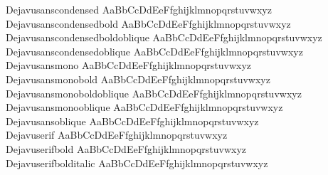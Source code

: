 \begin{tabbing}
Dejavusanscondensed \> { AaBbCcDdEeFfghijklmnopqrstuvwxyz} \\
Dejavusanscondensedbold \> { AaBbCcDdEeFfghijklmnopqrstuvwxyz} \\
Dejavusanscondensedboldoblique \> { AaBbCcDdEeFfghijklmnopqrstuvwxyz} \\
Dejavusanscondensedoblique \> { AaBbCcDdEeFfghijklmnopqrstuvwxyz} \\
Dejavusansmono \> { AaBbCcDdEeFfghijklmnopqrstuvwxyz} \\
Dejavusansmonobold \> { AaBbCcDdEeFfghijklmnopqrstuvwxyz} \\
Dejavusansmonoboldoblique \> { AaBbCcDdEeFfghijklmnopqrstuvwxyz} \\
Dejavusansmonooblique \> { AaBbCcDdEeFfghijklmnopqrstuvwxyz} \\
Dejavusansoblique \> { AaBbCcDdEeFfghijklmnopqrstuvwxyz} \\
Dejavuserif \> { AaBbCcDdEeFfghijklmnopqrstuvwxyz} \\
Dejavuserifbold \> { AaBbCcDdEeFfghijklmnopqrstuvwxyz} \\
Dejavuserifbolditalic \> { AaBbCcDdEeFfghijklmnopqrstuvwxyz} \\

\end{tabbing}

